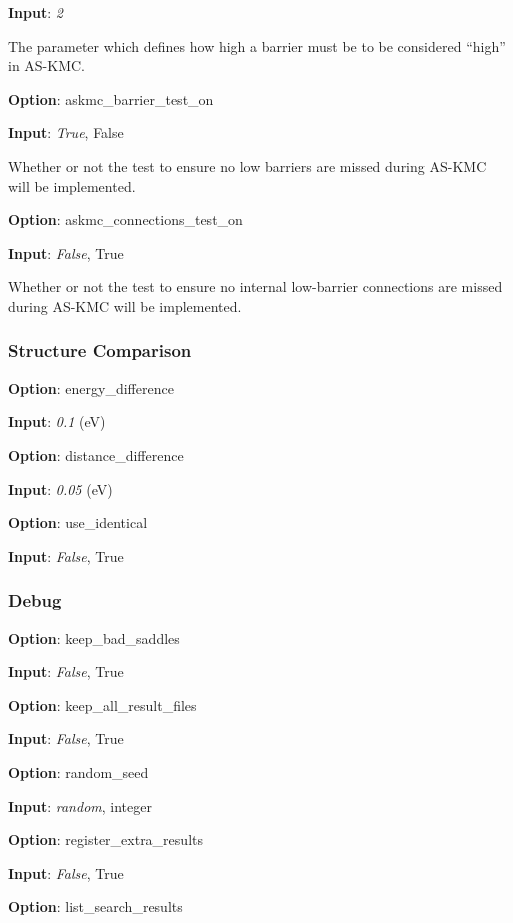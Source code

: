 \documentclass{article}
\begin{document}
\noindent\textbf{Input}:  \emph{2}

The parameter which defines how high a barrier must be to be considered ``high'' in AS-KMC.

\noindent\textbf{Option}:  askmc\_barrier\_test\_on

\noindent\textbf{Input}:  \emph{True}, False

Whether or not the test to ensure no low barriers are missed during AS-KMC will be implemented.

\noindent\textbf{Option}:  askmc\_connections\_test\_on

\noindent\textbf{Input}:  \emph{False}, True

Whether or not the test to ensure no internal low-barrier connections are missed during AS-KMC will be implemented.

\subsubsection{Structure Comparison}

\noindent\textbf{Option}:  energy\_difference

\noindent\textbf{Input}:  \emph{0.1} (eV)

\noindent\textbf{Option}:  distance\_difference

\noindent\textbf{Input}:  \emph{0.05} (eV)

\noindent\textbf{Option}:  use\_identical

\noindent\textbf{Input}:  \emph{False}, True

\subsubsection{Debug}

\noindent\textbf{Option}:  keep\_bad\_saddles

\noindent\textbf{Input}:  \emph{False}, True

\noindent\textbf{Option}:  keep\_all\_result\_files

\noindent\textbf{Input}:  \emph{False}, True

\noindent\textbf{Option}:  random\_seed

\noindent\textbf{Input}:  \emph{random}, integer

\noindent\textbf{Option}:  register\_extra\_results

\noindent\textbf{Input}:  \emph{False}, True

\noindent\textbf{Option}:  list\_search\_results
\end{document}

